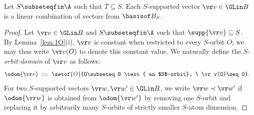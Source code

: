 %
%
\begin{lemma}[Spanning] \label{lem:lincomb}
Let $S \subseteqfin \A$ such that $T\subseteq S$.
Each $S$-supported vector $\vr v\in\GLin B$ is a linear combination of vectors from $\basisof B_S$.
\end{lemma}
%
\begin{proof}
Let $\vr v\in\GLin B$ and $S\subseteqfin\A$ such that $\supp{\vr v}\subseteq S$. 
By Lemma~\ref{lem:1O}(i), $\vr v$
is constant when restricted to every $S$-orbit $O$; we may thus write $\vr v(O)$ to denote this constant value.
%
We naturally define the \emph{$S$-orbit-domain} of $\vr v$ as follows:
\[
\odom {\vr v} \ := \ \setof{O}{O\subseteq B \text{ an $S$-orbit}, \ \vr v(O)\neq 0}.
\]
For two $S$-supported vectors  $\vr w, \vr w' \in \GLin B$, we write
$\vr w \prec \vr w'$ if $\odom{\vr w}$ is obtained from $\odom {\vr w'}$ by removing one $S$-orbit
and replacing it by arbitrarily many $S$-orbits of strictly smaller $S$-atom dimension. 


\end{proof}
